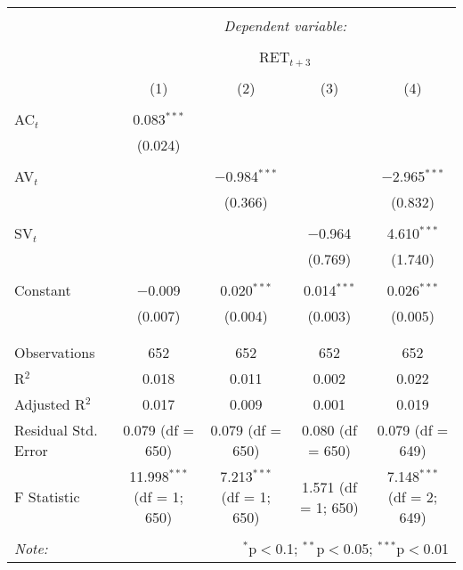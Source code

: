 
\begin{table}[!htbp] \centering 
  \caption{} 
  \label{} 
\begin{tabular}{@{\extracolsep{5pt}}lcccc} 
\\[-1.8ex]\hline 
\hline \\[-1.8ex] 
 & \multicolumn{4}{c}{\textit{Dependent variable:}} \\ 
\cline{2-5} 
\\[-1.8ex] & \multicolumn{4}{c}{RET$_{t+3}$} \\ 
\\[-1.8ex] & (1) & (2) & (3) & (4)\\ 
\hline \\[-1.8ex] 
 AC$_{t}$ & 0.083$^{***}$ &  &  &  \\ 
  & (0.024) &  &  &  \\ 
  & & & & \\ 
 AV$_{t}$ &  & $-$0.984$^{***}$ &  & $-$2.965$^{***}$ \\ 
  &  & (0.366) &  & (0.832) \\ 
  & & & & \\ 
 SV$_{t}$ &  &  & $-$0.964 & 4.610$^{***}$ \\ 
  &  &  & (0.769) & (1.740) \\ 
  & & & & \\ 
 Constant & $-$0.009 & 0.020$^{***}$ & 0.014$^{***}$ & 0.026$^{***}$ \\ 
  & (0.007) & (0.004) & (0.003) & (0.005) \\ 
  & & & & \\ 
\hline \\[-1.8ex] 
Observations & 652 & 652 & 652 & 652 \\ 
R$^{2}$ & 0.018 & 0.011 & 0.002 & 0.022 \\ 
Adjusted R$^{2}$ & 0.017 & 0.009 & 0.001 & 0.019 \\ 
Residual Std. Error & 0.079 (df = 650) & 0.079 (df = 650) & 0.080 (df = 650) & 0.079 (df = 649) \\ 
F Statistic & 11.998$^{***}$ (df = 1; 650) & 7.213$^{***}$ (df = 1; 650) & 1.571 (df = 1; 650) & 7.148$^{***}$ (df = 2; 649) \\ 
\hline 
\hline \\[-1.8ex] 
\textit{Note:}  & \multicolumn{4}{r}{$^{*}$p$<$0.1; $^{**}$p$<$0.05; $^{***}$p$<$0.01} \\ 
\end{tabular} 
\end{table} 
